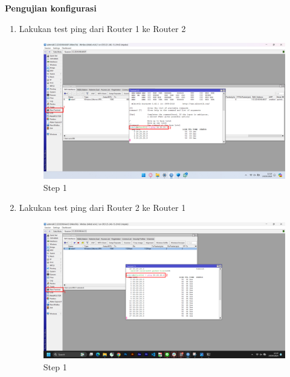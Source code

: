 \begin{center}
	\textbf{Pengujian konfigurasi}
	\begin{enumerate}
		\item Lakukan test ping dari Router 1 ke Router 2
		\begin{figure}[H]
			\centering
			\includegraphics[width=0.9\linewidth]{P1/img/per2/pc1/Step 4.png}
			\caption{Step 1}
			\label{fig:Ping Step 1(Per.2 PC1)}
		\end{figure}
		\item Lakukan test ping dari Router 2 ke Router 1
		\begin{figure}[H]
			\centering
			\includegraphics[width=0.9\linewidth]{P1/img/per1/pc2/Step 4.png}
			\caption{Step 1}
			\label{fig:Ping Step 2(Per.2 PC2)}
		\end{figure}
	\end{enumerate}
\end{center}

